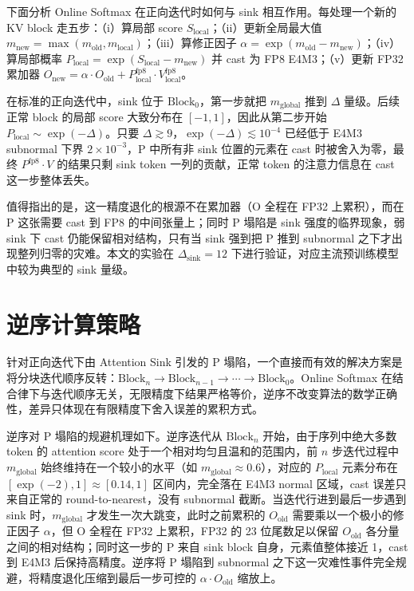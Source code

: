 下面分析 Online Softmax 在正向迭代时如何与 sink 相互作用。每处理一个新的 KV block 走五步：（i）算局部 score $S_{\text{local}}$；（ii）更新全局最大值 $m_{\text{new}} = \max(m_{\text{old}}, m_{\text{local}})$；（iii）算修正因子 $\alpha = \exp(m_{\text{old}} - m_{\text{new}})$；（iv）算局部概率 $P_{\text{local}} = \exp(S_{\text{local}} - m_{\text{new}})$ 并 cast 为 FP8 E4M3；（v）更新 FP32 累加器 $O_{\text{new}} = \alpha \cdot O_{\text{old}} + P_{\text{local}}^{\text{fp8}} \cdot V_{\text{local}}^{\text{fp8}}$。

在标准的正向迭代中，sink 位于 $\text{Block}_0$，第一步就把 $m_{\text{global}}$ 推到 $\Delta$ 量级。后续正常 block 的局部 score 大致分布在 $[-1, 1]$，因此从第二步开始 $P_{\text{local}} \sim \exp(-\Delta)$。只要 $\Delta \gtrsim 9$，$\exp(-\Delta) \lesssim 10^{-4}$ 已经低于 E4M3 subnormal 下界 $2 \times 10^{-3}$，P 中所有非 sink 位置的元素在 cast 时被舍入为零，最终 $P^{\text{fp8}} \cdot V$ 的结果只剩 sink token 一列的贡献，正常 token 的注意力信息在 cast 这一步整体丢失。

值得指出的是，这一精度退化的根源不在累加器（O 全程在 FP32 上累积），而在 P 这张需要 cast 到 FP8 的中间张量上；同时 P 塌陷是 sink 强度的临界现象，弱 sink 下 cast 仍能保留相对结构，只有当 sink 强到把 P 推到 subnormal 之下才出现整列归零的灾难。本文的实验在 $\Delta_{\text{sink}} = 12$ 下进行验证，对应主流预训练模型中较为典型的 sink 量级。

\section{逆序计算策略}

针对正向迭代下由 Attention Sink 引发的 P 塌陷，一个直接而有效的解决方案是将分块迭代顺序反转：$\text{Block}_n \to \text{Block}_{n-1} \to \cdots \to \text{Block}_0$。Online Softmax 在结合律下与迭代顺序无关，无限精度下结果严格等价，逆序不改变算法的数学正确性，差异只体现在有限精度下舍入误差的累积方式。

逆序对 P 塌陷的规避机理如下。逆序迭代从 $\text{Block}_n$ 开始，由于序列中绝大多数 token 的 attention score 处于一个相对均匀且温和的范围内，前 $n$ 步迭代过程中 $m_{\text{global}}$ 始终维持在一个较小的水平（如 $m_{\text{global}} \approx 0.6$），对应的 $P_{\text{local}}$ 元素分布在 $[\exp(-2), 1] \approx [0.14, 1]$ 区间内，完全落在 E4M3 normal 区域，cast 误差只来自正常的 round-to-nearest，没有 subnormal 截断。当迭代行进到最后一步遇到 sink 时，$m_{\text{global}}$ 才发生一次大跳变，此时之前累积的 $O_{\text{old}}$ 需要乘以一个极小的修正因子 $\alpha$，但 O 全程在 FP32 上累积，FP32 的 23 位尾数足以保留 $O_{\text{old}}$ 各分量之间的相对结构；同时这一步的 P 来自 sink block 自身，元素值整体接近 1，cast 到 E4M3 后保持高精度。逆序将 P 塌陷到 subnormal 之下这一灾难性事件完全规避，将精度退化压缩到最后一步可控的 $\alpha \cdot O_{\text{old}}$ 缩放上。


